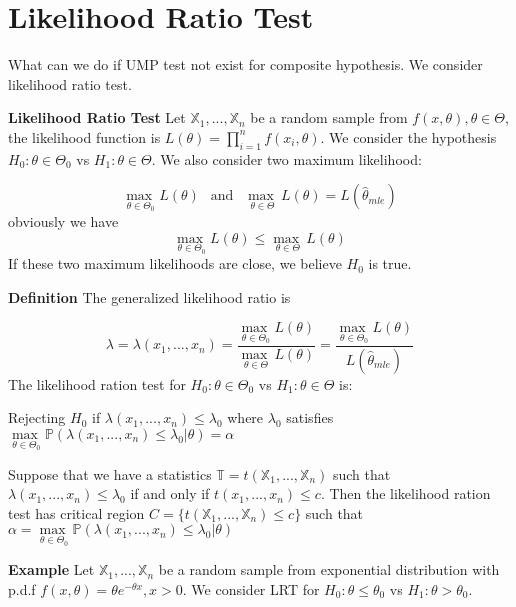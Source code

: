 \section{Likelihood Ratio Test}
What can we do if UMP test not exist for composite hypothesis. We consider likelihood ratio test.

\textbf{Likelihood Ratio Test} Let  $\mathbb{X}_1, ..., \mathbb{X}_n$ be a random sample from $f(x, \theta), \theta \in \Theta$, the likelihood function is $L(\theta) = \prod_{i=1}^n f(x_i, \theta)$. We consider the hypothesis $H_0: \theta \in \Theta_0$ vs $H_1: \theta \in \Theta$. We also consider two maximum likelihood: 

$$\underset{\theta\in\Theta_0}{\max\ } L(\theta) \ \ \text{ and }\ \  \underset{\theta\in\Theta}{\max\ } L(\theta) = L(\hat{\theta}_{mle})$$
obviously we have
$$\underset{\theta\in\Theta_0}{\max\ } L(\theta) \leq \underset{\theta\in\Theta}{\max\ } L(\theta)$$
If these two maximum likelihoods are close, we believe $H_0$ is true.

\textbf{Definition} The generalized likelihood ratio is 

$$\lambda = \lambda(x_1, ..., x_n) = \frac{\underset{\theta\in\Theta_0}{\max\ } L(\theta)}{\underset{\theta\in\Theta}{\max\ } L(\theta)}
= \frac{\underset{\theta\in\Theta_0}{\max\ } L(\theta)}{L(\hat{\theta}_{mle})}$$
The likelihood ration test for  $H_0: \theta \in \Theta_0$ vs $H_1: \theta \in \Theta$ is:

Rejecting $H_0$ if $\lambda(x_1, ..., x_n) \leq \lambda_0$ where $\lambda_0$ satisfies $\underset{\theta\in\Theta_0}{\max\ } \mathbb{P}(\lambda(x_1, ..., x_n) \leq \lambda_0 | \theta) = \alpha$

Suppose that we have a statistics $\mathbb{T} = t(\mathbb{X}_1, ..., \mathbb{X}_n)$ such that $\lambda(x_1, ..., x_n) \leq \lambda_0$ if and only if $t(x_1, ..., x_n) \leq c$. Then the likelihood ration test has critical region $C  = \{  t(\mathbb{X}_1, ..., \mathbb{X}_n) \leq c \}$ such that
$\alpha = \underset{\theta\in\Theta_0}{\max\ } \mathbb{P}(\lambda(x_1, ..., x_n) \leq \lambda_0 | \theta)$

\textbf{Example} Let $\mathbb{X}_1, ..., \mathbb{X}_n$ be a random sample from exponential distribution with p.d.f $f(x, \theta) = \theta e^{-\theta x}, x>0$. We consider LRT for $H_0: \theta \leq \theta_0$ vs $H_1: \theta > \theta_0$.

